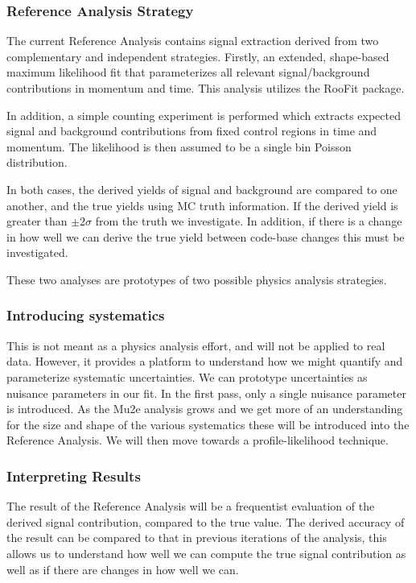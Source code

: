 \subsubsection{Reference Analysis Strategy}

The current Reference Analysis contains signal extraction derived from two complementary and independent strategies. Firstly, an extended, shape-based maximum likelihood fit that parameterizes all relevant signal/background contributions in momentum and time. This analysis utilizes the RooFit package.

In addition, a simple counting experiment is performed which extracts expected signal and background contributions from fixed control regions in time and momentum. The likelihood is then assumed to be a single bin Poisson distribution.

In both cases, the derived yields of signal and background are compared to one another, and the true yields using MC truth information. If the derived yield is greater than $\pm 2 \sigma$ from the truth we investigate. In addition, if there is a change in how well we can derive the true yield between code-base changes this must be investigated.

These two analyses are prototypes of two possible physics analysis strategies. %

\subsubsection{Introducing systematics}

This is not meant as a physics analysis effort, and will not be applied to real data. However, it provides a platform to understand how we might quantify and parameterize systematic uncertainties. We can prototype uncertainties as nuisance parameters in our fit. In the first pass, only a single nuisance parameter is introduced. As the Mu2e analysis grows and we get more of an understanding for the size and shape of the various systematics these will be introduced into the Reference Analysis. We will then move towards a profile-likelihood technique.

\subsubsection{Interpreting Results}

The result of the Reference Analysis will be a frequentist evaluation of the derived signal contribution, compared to the true value.  The derived accuracy of the result can be compared to that in previous iterations of the analysis, this allows us to understand how well we can compute the true signal contribution as well as if there are changes in how well we can.

